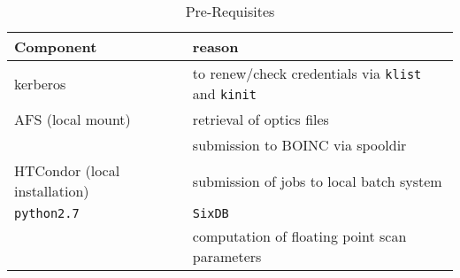 \begin{table}[h]
\begin{center}
    \caption{Pre-Requisites}
    \label{tab:Pre-Requisites}
    \begin{tabular}{|l|l|}
    \hline
    \rowcolor{blue!30}
    \textbf{Component} & \textbf{reason} \\
    \hline
    kerberos & to renew/check credentials via \texttt{klist} and \texttt{kinit} \\
    \hline
    AFS (local mount) & retrieval of optics files \\
    & submission to BOINC via spooldir\\
    \hline
    HTCondor (local installation) & submission of jobs to local batch system \\
    \hline
    \texttt{python2.7} & \texttt{SixDB} \\
    & computation of floating point scan parameters \\
    \hline
    \end{tabular}
\end{center}
\end{table}
